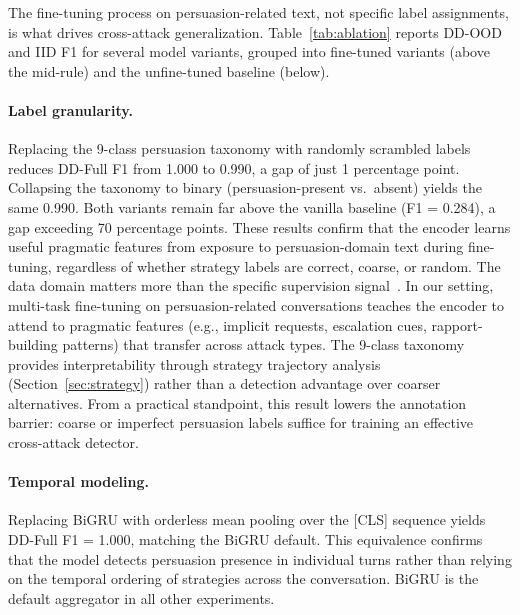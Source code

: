 The fine-tuning process on persuasion-related text, not specific label assignments, is what drives cross-attack generalization.
Table~\ref{tab:ablation} reports DD-OOD and IID F1 for several model variants, grouped into fine-tuned variants (above the mid-rule) and the unfine-tuned baseline (below).

\paragraph{Label granularity.}
Replacing the 9-class persuasion taxonomy with randomly scrambled labels reduces DD-Full F1 from 1.000 to 0.990, a gap of just 1 percentage point.
Collapsing the taxonomy to binary (persuasion-present vs.\ absent) yields the same 0.990.
Both variants remain far above the vanilla baseline (F1 = 0.284), a gap exceeding 70 percentage points.
These results confirm that the encoder learns useful pragmatic features from exposure to persuasion-domain text during fine-tuning, regardless of whether strategy labels are correct, coarse, or random.
The data domain matters more than the specific supervision signal~\citep{gururangan2020dontstop}.
In our setting, multi-task fine-tuning on persuasion-related conversations teaches the encoder to attend to pragmatic features (e.g., implicit requests, escalation cues, rapport-building patterns) that transfer across attack types.
The 9-class taxonomy provides interpretability through strategy trajectory analysis (Section~\ref{sec:strategy}) rather than a detection advantage over coarser alternatives.
From a practical standpoint, this result lowers the annotation barrier: coarse or imperfect persuasion labels suffice for training an effective cross-attack detector.

\paragraph{Temporal modeling.}
Replacing BiGRU with orderless mean pooling over the [CLS] sequence yields DD-Full F1 = 1.000, matching the BiGRU default.
This equivalence confirms that the model detects persuasion presence in individual turns rather than relying on the temporal ordering of strategies across the conversation.
BiGRU is the default aggregator in all other experiments.

